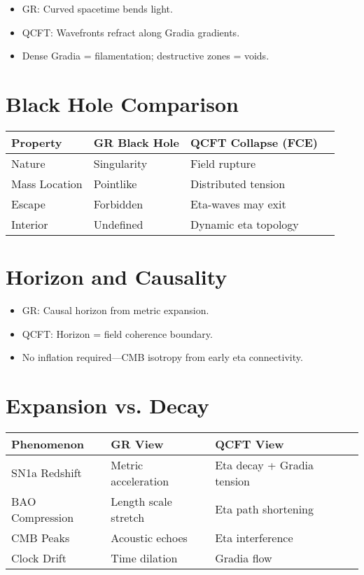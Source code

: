 \documentclass[12pt]{article}
\begin{document}
\begin{itemize}
\item GR: Curved spacetime bends light.
\item QCFT: Wavefronts refract along Gradia gradients.
\item Dense Gradia = filamentation; destructive zones = voids.
\end{itemize}

\section{Black Hole Comparison}

\begin{tabular}{@{}llll@{}}
\toprule
Property & GR Black Hole & QCFT Collapse (FCE) \\
\midrule
Nature & Singularity & Field rupture \\
Mass Location & Pointlike & Distributed tension \\
Escape & Forbidden & Eta-waves may exit \\
Interior & Undefined & Dynamic eta topology \\
\bottomrule
\end{tabular}

\section{Horizon and Causality}

\begin{itemize}
\item GR: Causal horizon from metric expansion.
\item QCFT: Horizon = field coherence boundary.
\item No inflation required—CMB isotropy from early eta connectivity.
\end{itemize}

\section{Expansion vs. Decay}

\begin{tabular}{@{}llll@{}}
\toprule
Phenomenon & GR View & QCFT View \\
\midrule
SN1a Redshift & Metric acceleration & Eta decay + Gradia tension \\
BAO Compression & Length scale stretch & Eta path shortening \\
CMB Peaks & Acoustic echoes & Eta interference \\
Clock Drift & Time dilation & Gradia flow \\
\bottomrule
\end{tabular}
\end{document}
